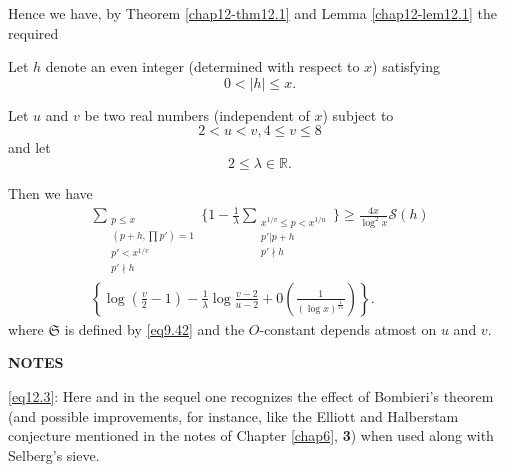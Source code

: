 Hence we have, by Theorem \ref{chap12-thm12.1} and Lemma
\ref{chap12-lem12.1} the required 

\begin{theorem}\label{chap12-thm12.2}
Let $h$ denote an even integer (determined with respect to $x$) satisfying
\begin{equation*}
0 < |h| \leq x. \tag{12.34}\label{eq12.34}
\end{equation*}
\end{theorem}

Let $u$ and $v$ be two real numbers (independent of $x$) subject to
\begin{equation*}
2 <u < v, 4 \leq v \leq 8 \tag{12.35}\label{eq12.35}
\end{equation*}
and let
\begin{equation*}
2 \leq \lambda \in \mathbb{R}. \tag{12.36}\label{eq12.36}
\end{equation*}

Then we have
\begin{gather*}
\sum_{\substack{p \leq x \\ (p+h,\prod p')=1 \\ p'<x^{1/v} \\ p'
    \nmid  h}} \bigg\{1-\frac{1}{\lambda}
\sum_{\substack{x^{1/v} \leq p < x^{1/u}\\ p' | p+h \\ p' \nmid h}}
\bigg\} \geq \frac{4x}{\log^2 x}\mathscr{S} (h)\\ 
 \left\{\log
(\frac{v}{2}-1)-\frac{1}{\lambda}\log \frac{v-2}{u-2}+0
(\frac{1}{(\log x)^{\frac{1}{15}}})\right\}. \tag{12.37}\label{eq12.37}
\end{gather*}
where $\mathfrak{S}$ is defined by \eqref{eq9.42} and the $O$-constant
depends atmost on $u$ and $v$. 

\medskip
\begin{center}
{\bf NOTES}\pageoriginale
\end{center}

\eqref{eq12.3}: Here and in the sequel one recognizes the effect of
Bombi\-eri's theorem (and possible improvements, for instance, like the
Elliott and Halberstam \cite{key2} conjecture mentioned in the notes
of Chapter \ref{chap6}, {\bf 3}) when used along with Selberg's sieve.

